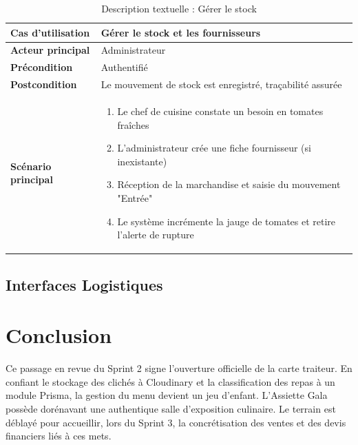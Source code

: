 \begin{table}[H]
    \centering
    \caption{Description textuelle : Gérer le stock}
    \label{tab:desc_stock}
    \renewcommand{\arraystretch}{1.3}
    \begin{tabular}{|p{4cm}|p{8.5cm}|}
        \hline
        \textbf{Cas d'utilisation} & Gérer le stock et les fournisseurs \\
        \hline
        \textbf{Acteur principal} & Administrateur \\
        \hline
        \textbf{Précondition} & Authentifié \\
        \hline
        \textbf{Postcondition} & Le mouvement de stock est enregistré, traçabilité assurée \\
        \hline
        \textbf{Scénario principal} &
        \begin{enumerate}
            \item Le chef de cuisine constate un besoin en tomates fraîches
            \item L'administrateur crée une fiche fournisseur (si inexistante)
            \item Réception de la marchandise et saisie du mouvement "Entrée"
            \item Le système incrémente la jauge de tomates et retire l'alerte de rupture
        \end{enumerate} \\
        \hline
    \end{tabular}
\end{table}

\subsection{Interfaces Logistiques}



\section*{Conclusion}

\begin{samepage}
Ce passage en revue du Sprint 2 signe l'ouverture officielle de la carte traiteur. En confiant le stockage des clichés à Cloudinary et la classification des repas à un module Prisma, la gestion du menu devient un jeu d'enfant. L'Assiette Gala possède dorénavant une authentique salle d'exposition culinaire. Le terrain est déblayé pour accueillir, lors du Sprint 3, la concrétisation des ventes et des devis financiers liés à ces mets.
\end{samepage}

